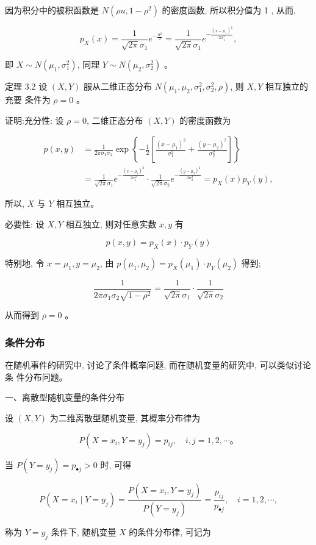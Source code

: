 \documentclass{beamer}
\begin{document}
	\begin{frame}
		因为积分中的被积函数是 $N\left(\rho u, 1-\rho^{2}\right)$ 的密度函数, 所以积分值为 1 , 从而,
		
		$$
		p_{X}(x)=\frac{1}{\sqrt{2 \pi} \sigma_{1}} e^{-\frac{u^{2}}{2}}=\frac{1}{\sqrt{2 \pi} \sigma_{1}} e^{-\frac{\left(x-\mu_{1}\right)^{2}}{2 \sigma_{1}^{2}}},
		$$
		
		即 $X \sim N\left(\mu_{1}, \sigma_{1}^{2}\right)$, 同理 $Y \sim N\left(\mu_{2}, \sigma_{2}^{2}\right)$ 。
	\end{frame}
	
	\begin{frame}
		定理 3.2 设 $(X, Y)$ 服从二维正态分布 $N\left(\mu_{1}, \mu_{2}, \sigma_{1}^{2}, \sigma_{2}^{2}, \rho\right)$, 则 $X, Y$ 相互独立的充要 条件为 $\rho=0$ 。
		
		证明:充分性: 设 $\rho=0$, 二维正态分布 $(X, Y)$ 的密度函数为
		
		$$
		\begin{aligned}
			p(x, y) & =\frac{1}{2 \pi \sigma_{1} \sigma_{2}} \exp \left\{-\frac{1}{2}\left[\frac{\left(x-\mu_{1}\right)^{2}}{\sigma_{1}^{2}}+\frac{\left(y-\mu_{2}\right)^{2}}{\sigma_{2}^{2}}\right]\right\} \\
			& =\frac{1}{\sqrt{2 \pi} \sigma_{1}} e^{-\frac{\left(x-\mu_{1}\right)^{2}}{2 \sigma_{1}^{2}}} \cdot \frac{1}{\sqrt{2 \pi} \sigma_{2}} e^{-\frac{\left(y-\mu_{2}\right)^{2}}{2 \sigma_{2}^{2}}}=p_{X}(x) p_{Y}(y),
		\end{aligned}
		$$
		
		所以, $X$ 与 $Y$ 相互独立。
		
		必要性: 设 $X, Y$ 相互独立, 则对任意实数 $x, y$ 有
		
		$$
		p(x, y)=p_{X}(x) \cdot p_{Y}(y)
		$$
		
		特别地, 令 $x=\mu_{1}, y=\mu_{2}$, 由 $p\left(\mu_{1}, \mu_{2}\right)=p_{X}\left(\mu_{1}\right) \cdot p_{Y}\left(\mu_{2}\right)$ 得到;
		
		$$
		\frac{1}{2 \pi \sigma_{1} \sigma_{2} \sqrt{1-\rho^{2}}}=\frac{1}{\sqrt{2 \pi} \sigma_{1}} \cdot \frac{1}{\sqrt{2 \pi} \sigma_{2}}
		$$
		
		从而得到 $\rho=0$ 。
	\end{frame}
	
	\begin{frame}
		\frametitle{条件分布}
		在随机事件的研究中, 讨论了条件概率问题, 而在随机变量的研究中, 可以类似讨论条 件分布问题。
		
		一、离散型随机变量的条件分布
		
		设 $(X, Y)$ 为二维离散型随机变量, 其概率分布律为
		
		$$
		P\left(X=x_{i}, Y=y_{j}\right)=p_{i j}, \quad i, j=1,2, \cdots 。
		$$
		
		当 $P\left(Y=y_{j}\right)=p_{\bullet j}>0$ 时, 可得
		
		$$
		P\left(X=x_{i} \mid Y=y_{j}\right)=\frac{P\left(X=x_{i}, Y=y_{j}\right)}{P\left(Y=y_{j}\right)}=\frac{p_{i j}}{p_{\bullet j}}, \quad i=1,2, \cdots,
		$$
		
		称为 $Y=y_{j}$ 条件下, 随机变量 $X$ 的条件分布律, 可记为
	\end{frame}
	
\end{document}
